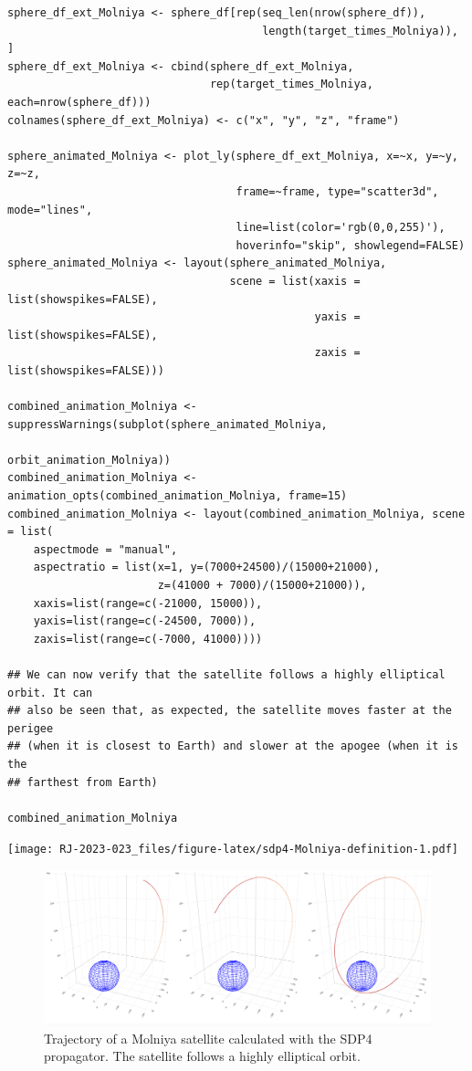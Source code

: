 \begin{verbatim}
sphere_df_ext_Molniya <- sphere_df[rep(seq_len(nrow(sphere_df)),
                                       length(target_times_Molniya)), ]
sphere_df_ext_Molniya <- cbind(sphere_df_ext_Molniya,
                               rep(target_times_Molniya, each=nrow(sphere_df)))
colnames(sphere_df_ext_Molniya) <- c("x", "y", "z", "frame")

sphere_animated_Molniya <- plot_ly(sphere_df_ext_Molniya, x=~x, y=~y, z=~z,
                                   frame=~frame, type="scatter3d", mode="lines",
                                   line=list(color='rgb(0,0,255)'),
                                   hoverinfo="skip", showlegend=FALSE)
sphere_animated_Molniya <- layout(sphere_animated_Molniya,
                                  scene = list(xaxis = list(showspikes=FALSE), 
                                               yaxis = list(showspikes=FALSE),
                                               zaxis = list(showspikes=FALSE)))

combined_animation_Molniya <- suppressWarnings(subplot(sphere_animated_Molniya,
                                                       orbit_animation_Molniya))
combined_animation_Molniya <- animation_opts(combined_animation_Molniya, frame=15)
combined_animation_Molniya <- layout(combined_animation_Molniya, scene = list(
    aspectmode = "manual",
    aspectratio = list(x=1, y=(7000+24500)/(15000+21000), 
                       z=(41000 + 7000)/(15000+21000)),
    xaxis=list(range=c(-21000, 15000)),
    yaxis=list(range=c(-24500, 7000)),
    zaxis=list(range=c(-7000, 41000))))

## We can now verify that the satellite follows a highly elliptical orbit. It can
## also be seen that, as expected, the satellite moves faster at the perigee
## (when it is closest to Earth) and slower at the apogee (when it is the
## farthest from Earth)

combined_animation_Molniya
\end{verbatim}

\texttt{[image: RJ-2023-023\_files/figure-latex/sdp4-Molniya-definition-1.pdf]}

\begin{figure}[H]

{\centering \includegraphics[width=0.99\linewidth]{static/Molniya_static} 

}

\caption{Trajectory of a Molniya satellite calculated with the SDP4 propagator. The satellite follows a highly elliptical orbit.}\label{fig:sdp4-Molniya-figure-static}
\end{figure}

